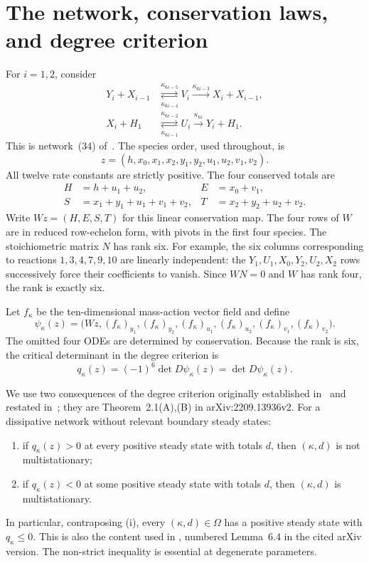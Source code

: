 \documentclass[11pt,a4paper]{article}
\numberwithin{equation}{section}
\theoremstyle{remark}\newtheorem{remark}[theorem]{Remark}
\newcommand{\Om}{\Omega}
\begin{document}
\section{The network, conservation laws, and degree criterion}\label{sec:network}
For $i=1,2$, consider
\begin{equation}\label{eq:network}
\begin{aligned}
Y_i+X_{i-1}&\underset{\kappa_{6i-4}}{\stackrel{\kappa_{6i-5}}{\rightleftarrows}}V_i
 \xrightarrow{\kappa_{6i-3}}X_i+X_{i-1},\\
X_i+H_1&\underset{\kappa_{6i-1}}{\stackrel{\kappa_{6i-2}}{\rightleftarrows}}U_i
 \xrightarrow{\kappa_{6i}}Y_i+H_1 .
\end{aligned}
\end{equation}
This is network~(34) of~\cite{KW}. The species order, used throughout, is
\[
 z=(h,x_0,x_1,x_2,y_1,y_2,u_1,u_2,v_1,v_2).
\]
All twelve rate constants are strictly positive. The four conserved totals are
\begin{equation}\label{eq:totals}
\begin{aligned}
H&=h+u_1+u_2,& E&=x_0+v_1,\\
S&=x_1+y_1+u_1+v_1+v_2,& T&=x_2+y_2+u_2+v_2.
\end{aligned}
\end{equation}
Write $Wz=(H,E,S,T)$ for this linear conservation map. The four rows of $W$ are in reduced row-echelon form, with pivots in the first four species. The stoichiometric matrix $N$ has rank six. For example, the six columns corresponding to reactions $1,3,4,7,9,10$ are linearly independent: the $Y_1,U_1,X_0,Y_2,U_2,X_2$ rows successively force their coefficients to vanish. Since $WN=0$ and $W$ has rank four, the rank is exactly six.

Let $f_\kappa$ be the ten-dimensional mass-action vector field and define
\begin{equation}\label{eq:psi}
\psi_\kappa(z)=\bigl(Wz,(f_\kappa)_{y_1},(f_\kappa)_{y_2},
(f_\kappa)_{u_1},(f_\kappa)_{u_2},(f_\kappa)_{v_1},(f_\kappa)_{v_2}\bigr).
\end{equation}
The omitted four ODEs are determined by conservation. Because the rank is six, the critical determinant in the degree criterion is
\[
q_\kappa(z)=(-1)^6\det D\psi_\kappa(z)=\det D\psi_\kappa(z).
\]

We use two consequences of the degree criterion originally established in~\cite[Theorem~1]{CFMW} and restated in~\cite[Theorem~1]{TF}; they are Theorem~2.1(A),(B) in arXiv:2209.13936v2. For a dissipative network without relevant boundary steady states:
\begin{enumerate}[label=(\roman*)]
\item if $q_\kappa(z)>0$ at every positive steady state with totals $d$, then $(\kappa,d)$ is not multistationary;
\item if $q_\kappa(z)<0$ at some positive steady state with totals $d$, then $(\kappa,d)$ is multistationary.
\end{enumerate}
In particular, contraposing (i), every $(\kappa,d)\in\Om$ has a positive steady state with $q_\kappa\leq0$. This is also the content used in \cite[Lemma~9]{TF}, numbered Lemma~6.4 in the cited arXiv version. The non-strict inequality is essential at degenerate parameters.
\end{document}
